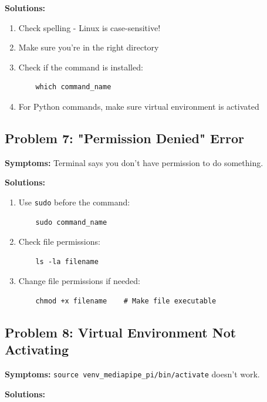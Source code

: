 \documentclass[12pt,a4paper]{article}
\begin{document}
\textbf{Solutions:}

\begin{enumerate}
    \item Check spelling - Linux is case-sensitive!
    \item Make sure you're in the right directory
    \item Check if the command is installed:
    \begin{lstlisting}
    which command_name
    \end{lstlisting}
    \item For Python commands, make sure virtual environment is activated
\end{enumerate}

\subsection{Problem 7: "Permission Denied" Error}

\textbf{Symptoms:} Terminal says you don't have permission to do something.

\textbf{Solutions:}

\begin{enumerate}
    \item Use \texttt{sudo} before the command:
    \begin{lstlisting}
    sudo command_name
    \end{lstlisting}
    \item Check file permissions:
    \begin{lstlisting}
    ls -la filename
    \end{lstlisting}
    \item Change file permissions if needed:
    \begin{lstlisting}
    chmod +x filename    # Make file executable
    \end{lstlisting}
\end{enumerate}

\subsection{Problem 8: Virtual Environment Not Activating}

\textbf{Symptoms:} \texttt{source venv\_mediapipe\_pi/bin/activate} doesn't work.

\textbf{Solutions:}
\end{document}
